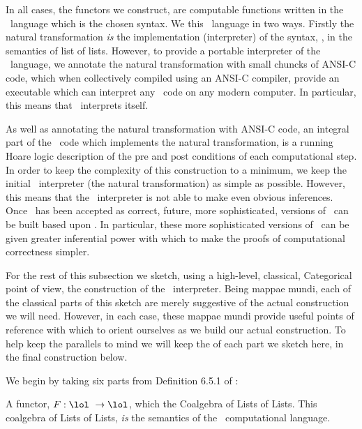 In all cases, the functors we construct, are computable functions written 
in the \joylolZero\ language which is the chosen syntax. We 
 this \joylolZero\ language in two ways. Firstly the 
natural transformation \emph{is} the implementation (interpreter) of the 
syntax, \joylolZero, in the semantics of list of lists. However, to 
provide a portable interpreter of the \joylolZero\ language, we annotate 
the natural transformation with small chuncks of ANSI-C code, which when 
collectively compiled using an ANSI-C compiler, provide an executable 
which can interpret any \joylolZero\ code on any modern computer. In 
particular, this means that \joylolZero\ interprets itself. 

As well as annotating the natural transformation with ANSI-C code, an 
integral part of the \joylolZero\ code which implements the natural 
transformation, is a running Hoare logic description of the pre and post 
conditions of each computational step. In order to keep the complexity of 
this construction to a minimum, we keep the initial \joylolZero\ 
interpreter (the natural transformation) as simple as possible. However, 
this means that the \joylolZero\ interpreter is not able to make even 
obvious inferences. Once \joylolZero\ has been accepted as correct, 
future, more sophisticated, versions of \joylol\ can be built based upon 
\joylolZero. In particular, these more sophisticated versions of \joylol\ 
can be given greater inferential power with which to make the proofs of 
computational correctness simpler. 

For the rest of this subsection we sketch, using a high-level, classical, 
Categorical point of view, the construction of the \joylolZero\ 
interpreter. Being mappae mundi, each of the classical parts of this 
sketch are merely suggestive of the actual construction we will need. 
However, in each case, these mappae mundi provide useful points of 
reference with which to orient ourselves as we build our actual 
construction. To help keep the parallels to mind we will keep the 
\quote{names} of each  part we sketch here, in the final 
construction below. 

We begin by taking six \quote{component} parts from Definition 6.5.1 of 
\cite{jacobs2017coalgebras}: 

\startitemize[n]

\item A functor, $F : \lol\ \rightarrow \lol$, which  the 
Coalgebra of Lists of Lists. This coalgebra of Lists of Lists, \emph{is} 
the semantics of the \joylolZero\ computational language. 

